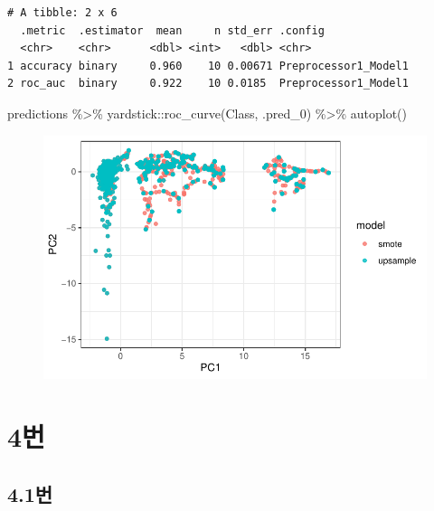 \documentclass[
  letterpaper,
  DIV=11,
  numbers=noendperiod]{scrreprt}
\newenvironment{Shaded}{\begin{snugshade}}{\end{snugshade}}
\newcommand{\FunctionTok}[1]{\textcolor[rgb]{0.28,0.35,0.67}{#1}}
\newcommand{\NormalTok}[1]{\textcolor[rgb]{0.00,0.23,0.31}{#1}}
\newcommand{\SpecialCharTok}[1]{\textcolor[rgb]{0.37,0.37,0.37}{#1}}
\begin{document}
\begin{verbatim}
# A tibble: 2 x 6
  .metric  .estimator  mean     n std_err .config             
  <chr>    <chr>      <dbl> <int>   <dbl> <chr>               
1 accuracy binary     0.960    10 0.00671 Preprocessor1_Model1
2 roc_auc  binary     0.922    10 0.0185  Preprocessor1_Model1
\end{verbatim}

\begin{Shaded}
\begin{Highlighting}[]
\NormalTok{predictions }\SpecialCharTok{\%\textgreater{}\%} 
\NormalTok{  yardstick}\SpecialCharTok{::}\FunctionTok{roc\_curve}\NormalTok{(Class, .pred\_0) }\SpecialCharTok{\%\textgreater{}\%} \FunctionTok{autoplot}\NormalTok{()}
\end{Highlighting}
\end{Shaded}

\begin{figure}[H]

{\centering \includegraphics{./test_27_files/figure-pdf/unnamed-chunk-9-1.pdf}

}

\end{figure}

\hypertarget{uxbc88-9}{%
\chapter*{4번}\label{uxbc88-9}}


\hypertarget{uxbc88-10}{%
\section*{4.1번}\label{uxbc88-10}}
\end{document}
